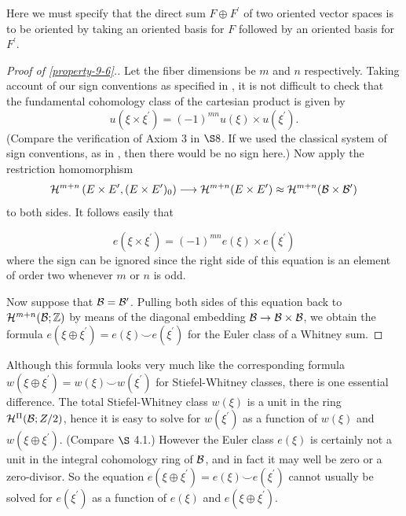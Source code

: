 Here we must specify that the direct sum $F \oplus F^{\prime}$ of two oriented vector spaces is to be oriented by taking an oriented basis for $F$ followed by an oriented basis for $F^{\prime}$.
\begin{proof}[Proof of \cref{property-9-6}.]
Let the fiber dimensions be $m$ and $n$ respectively. Taking account of our sign conventions as specified in , it is not difficult to check that the fundamental cohomology class of the cartesian product is given by
\[
u(\xi \times \xi^{\prime})=(-1)^{mn} u(\xi) \times u(\xi^{\prime}) .
\]
(Compare the verification of Axiom 3 in $\S 8$. If we used the classical system of sign conventions, as in \cite{57}, then there would be no sign here.) Now apply the restriction homomorphism
\[
\mathcal{H}^{m+ n }\left(E \times E^{\prime},(E \times E^{\prime})_{0}\right) \longrightarrow \mathcal{H}^{m+ n }(E \times E^{\prime}) \approx \mathcal{H}^{m+ n }(\mathcal{B} \times \mathcal{B}^{\prime})
\]
to both sides. It follows easily that

\[
e(\xi \times \xi^{\prime})=(-1)^{mn} e(\xi) \times e(\xi^{\prime})
\]
where the sign can be ignored since the right side of this equation is an element of order two whenever $m$ or $n$ is odd.

Now suppose that $\mathcal{B}=\mathcal{B}'$. Pulling both sides of this equation back to $\mathcal{H}^{m+ n }(\mathcal{B} ; \mathbb{Z})$ by means of the diagonal embedding $\mathcal{B} \rightarrow \mathcal{B} \times \mathcal{B}$, we obtain the formula $e(\xi \oplus \xi^{\prime})=e(\xi) \smile e(\xi^{\prime})$ for the Euler class of a Whitney sum.
\end{proof}
\begin{remark*}
	Although this formula looks very much like the corresponding formula $w(\xi \oplus \xi^{\prime})=w(\xi) \smile w(\xi^{\prime})$ for Stiefel-Whitney classes, there is one essential difference. The total Stiefel-Whitney class $w(\xi)$ is a unit in the ring $\mathcal{H}^{\Pi}(\mathcal{B} ; Z / 2)$, hence it is easy to solve for $w(\xi^{\prime})$ as a function of $w(\xi)$ and $w(\xi \oplus \xi^{\prime})$. (Compare $\S$ 4.1.) However the Euler class $e(\xi)$ is certainly not a unit in the integral cohomology ring of $\mathcal{B}$, and in fact it may well be zero or a zero-divisor. So the equation $e(\xi \oplus \xi^{\prime})= e(\xi) \smile e(\xi^{\prime})$ cannot usually be solved for $e(\xi^{\prime})$ as a function of $e(\xi)$ and $e(\xi \oplus \xi^{\prime})$.
\end{remark*} 

